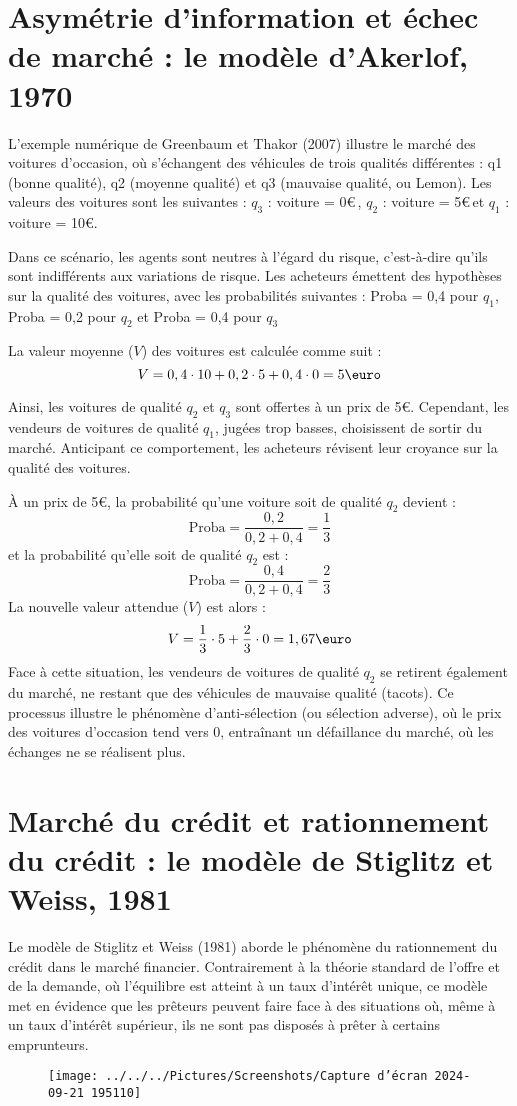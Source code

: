 \documentclass[a4paper, 12pt]{report}
\begin{document}
\section{Asymétrie d’information et échec de marché : le modèle d’Akerlof, 1970}

L'exemple numérique de Greenbaum et Thakor (2007) illustre le marché des voitures d'occasion, où s'échangent des véhicules de trois qualités différentes : q1 (bonne qualité), q2 (moyenne qualité) et q3 (mauvaise qualité, ou Lemon).  Les valeurs des voitures sont les suivantes : $q_3$ : voiture = 0\euro\,, $q_2$ : voiture = 5\euro\,et $q_1$ : voiture = 10\euro.

Dans ce scénario, les agents sont neutres à l'égard du risque, c'est-à-dire qu'ils sont indifférents aux variations de risque. Les acheteurs émettent des hypothèses sur la qualité des voitures, avec les probabilités suivantes : Proba = 0,4 pour $q_1$, Proba = 0,2 pour $q_2$ et Proba = 0,4 pour $q_3$

La valeur moyenne ($V$) des voitures est calculée comme suit :
$$
V=0,4\cdot10+0,2\cdot5+0,4\cdot0=5\text{\euro}
$$

Ainsi, les voitures de qualité $q_2$ et $q_3$ sont offertes à un prix de 5\euro. Cependant, les vendeurs de voitures de qualité $q_1$, jugées trop basses, choisissent de sortir du marché. Anticipant ce comportement, les acheteurs révisent leur croyance sur la qualité des voitures.

À un prix de 5\euro, la probabilité qu'une voiture soit de qualité $q_2$ devient :
$$
\text{Proba}=\frac{0,2}{0,2+0,4}=\frac{1}{3}
$$
et la probabilité qu'elle soit de qualité $q_2$ est :
$$
\text{Proba}=\frac{0,4}{0,2+0,4}=\frac{2}{3}
$$
La nouvelle valeur attendue ($V$) est alors :
$$
V=\frac{1}{3}\cdot5+\frac{2}{3}\cdot0=1,67\text{\euro}
$$
Face à cette situation, les vendeurs de voitures de qualité $q_2$ se retirent également du marché, ne restant que des véhicules de mauvaise qualité (tacots). Ce processus illustre le phénomène d'anti-sélection (ou sélection adverse), où le prix des voitures d'occasion tend vers 0, entraînant un défaillance du marché, où les échanges ne se réalisent plus.

\section{Marché du crédit et rationnement du crédit : le modèle de Stiglitz et Weiss, 1981}

Le modèle de Stiglitz et Weiss (1981) aborde le phénomène du rationnement du crédit dans le marché financier. Contrairement à la théorie standard de l'offre et de la demande, où l'équilibre est atteint à un taux d'intérêt unique, ce modèle met en évidence que les prêteurs peuvent faire face à des situations où, même à un taux d'intérêt supérieur, ils ne sont pas disposés à prêter à certains emprunteurs.
\newpage
\begin{wrapfigure}{r}{0.6\textwidth}
	\centering
\texttt{[image: ../../../Pictures/Screenshots/Capture d'écran 2024-09-21 195110]}
\end{wrapfigure}
\end{document}
